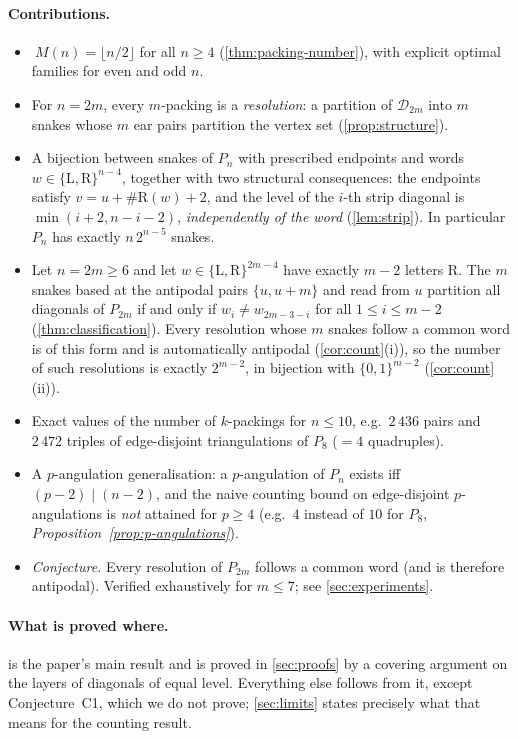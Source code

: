 \documentclass[11pt,a4paper]{article}
\theoremstyle{definition}
\theoremstyle{remark}
\newcommand{\diags}{\ensuremath{\mathcal{D}}}
\newcommand{\Li}{\mathrm{L}}
\newcommand{\Ri}{\mathrm{R}}
\begin{document}
\paragraph{Contributions.}
\begin{itemize}
\item[\textbf{T1.}] $\ M(n)=\lfloor n/2\rfloor$ for all $n\ge 4$ (\cref{thm:packing-number}),
with explicit optimal families for even and odd $n$.
\item[\textbf{T2.}] For $n=2m$, every $m$-packing is a \emph{resolution}: a partition of
$\diags_{2m}$ into $m$ snakes whose $m$ ear pairs partition the vertex set
(\cref{prop:structure}).
\item[\textbf{L3.}] A bijection between snakes of $P_n$ with prescribed endpoints and
words $w\in\{\Li,\Ri\}^{n-4}$, together with two structural consequences: the endpoints
satisfy $v=u+\#\Ri(w)+2$, and the level of the $i$-th strip diagonal is
$\min(i+2,n-i-2)$, \emph{independently of the word} (\cref{lem:strip}).  In particular
$P_n$ has exactly $n\,2^{n-5}$ snakes.
\item[\textbf{T4.}] Let $n=2m\ge 6$ and let $w\in\{\Li,\Ri\}^{2m-4}$ have exactly $m-2$
letters $\Ri$.  The $m$ snakes based at the antipodal pairs $\{u,u+m\}$ and read from $u$
partition all diagonals of $P_{2m}$ if and only if $w_i\ne w_{2m-3-i}$ for all
$1\le i\le m-2$ (\cref{thm:classification}).  Every resolution whose $m$ snakes follow a
common word is of this form and is automatically antipodal (\cref{cor:count}(i)), so the
number of such resolutions is exactly $2^{m-2}$, in bijection with $\{0,1\}^{m-2}$
(\cref{cor:count}(ii)).
\item[\textbf{T5.}] Exact values of the number of $k$-packings for $n\le 10$, e.g.\ 
$2\,436$ pairs and $2\,472$ triples of edge-disjoint triangulations of $P_8$ ($=4$
quadruples).
\item[\textbf{T6.}] A $p$-angulation generalisation: a $p$-angulation of $P_n$ exists iff
$(p-2)\mid(n-2)$, and the naive counting bound on edge-disjoint $p$-angulations is
\emph{not} attained for $p\ge4$ (e.g.\ $4$ instead of $10$ for $P_8$,
\emph{Proposition~\ref{prop:p-angulations}}).
\item[\textbf{C1.}] \emph{Conjecture.} Every resolution of $P_{2m}$ follows a common word
(and is therefore antipodal).  Verified exhaustively for $m\le 7$; see
\cref{sec:experiments}.
\end{itemize}

\paragraph{What is proved where.}
 is the paper's main result and is proved in \cref{sec:proofs} by a
covering argument on the layers of diagonals of equal level.  Everything else follows from
it, except Conjecture~C1, which we do not prove; \cref{sec:limits} states precisely what
that means for the counting result.
\end{document}
